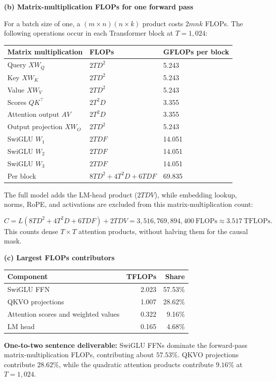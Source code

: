 \documentclass[10pt,letterpaper]{article}
\begin{document}
\newpage
\noindent\textbf{(b) Matrix-multiplication FLOPs for one forward pass}\par
For a batch size of one, a $(m\times n)(n\times k)$ product costs $2mnk$ FLOPs. The following operations occur in each Transformer block at $T=1{,}024$:\par
\begin{center}
\begin{tabular}{lll}
\hline
Matrix multiplication & FLOPs & GFLOPs per block\\
\hline
Query $XW_Q$ & $2TD^2$ & 5.243\\
Key $XW_K$ & $2TD^2$ & 5.243\\
Value $XW_V$ & $2TD^2$ & 5.243\\
Scores $QK^\top$ & $2T^2D$ & 3.355\\
Attention output $AV$ & $2T^2D$ & 3.355\\
Output projection $XW_O$ & $2TD^2$ & 5.243\\
SwiGLU $W_1$ & $2TDF$ & 14.051\\
SwiGLU $W_2$ & $2TDF$ & 14.051\\
SwiGLU $W_3$ & $2TDF$ & 14.051\\
\hline
Per block & $8TD^2+4T^2D+6TDF$ & 69.835\\
\hline
\end{tabular}
\end{center}
The full model adds the LM-head product ($2TDV$), while embedding lookup, norms, RoPE, and activations are excluded from this matrix-multiplication count:\par
\[
C=L(8TD^2+4T^2D+6TDF)+2TDV
=\boxed{3{,}516{,}769{,}894{,}400}\ \text{FLOPs}
\approx 3.517\ \text{TFLOPs}.
\]
This counts dense $T\times T$ attention products, without halving them for the causal mask.\par
\medskip\noindent\textbf{(c) Largest FLOPs contributors}\par
\begin{center}
\begin{tabular}{lrr}
\hline
Component & TFLOPs & Share\\
\hline
SwiGLU FFN & 2.023 & 57.53\%\\
QKVO projections & 1.007 & 28.62\%\\
Attention scores and weighted values & 0.322 & 9.16\%\\
LM head & 0.165 & 4.68\%\\
\hline
\end{tabular}
\end{center}
\textbf{One-to-two sentence deliverable:} SwiGLU FFNs dominate the forward-pass matrix-multiplication FLOPs, contributing about $57.53\%$. QKVO projections contribute $28.62\%$, while the quadratic attention products contribute $9.16\%$ at $T=1{,}024$.\par
\end{document}
